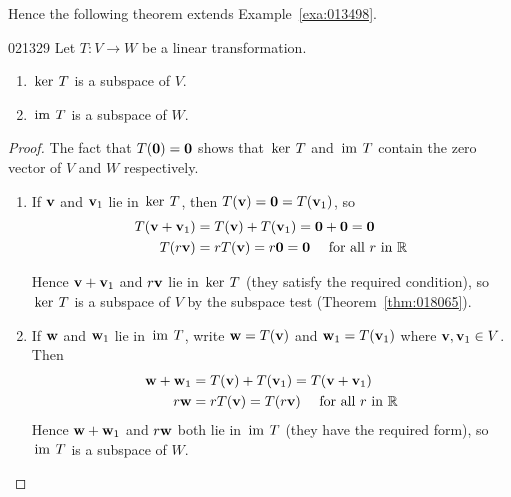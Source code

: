 Hence the following theorem extends Example~\ref{exa:013498}.

\newpage
\begin{theorem}{}{021329}
Let $T : V \to W$ be a linear transformation.


\begin{enumerate}
\item $\thinspace\operatorname{ker \medspace}T$ is a subspace of $V$.

\item $\thinspace\operatorname{im \medspace}T$ is a subspace of $W$.

\end{enumerate}
\end{theorem}

\begin{proof}
The fact that $T(\textbf{0}) = \textbf{0}$ shows that $\thinspace\operatorname{ker \medspace}T$ and $\thinspace\operatorname{im \medspace}T$ contain the zero vector of $V$ and $W$ respectively.


\begin{enumerate}
\item If $\textbf{v}$ and $\textbf{v}_{1}$ lie in $\thinspace\operatorname{ker \medspace}T$, then $T(\textbf{v}) = \textbf{0} = T(\textbf{v}_{1})$, so
\begin{align*}
T(\textbf{v} + \textbf{v}_1) &= T(\textbf{v}) + T(\textbf{v}_1) = \textbf{0} + \textbf{0} = \textbf{0} \\
T(r\textbf{v}) &= rT(\textbf{v}) = r\textbf{0} = \textbf{0} \quad \mbox{ for all } r \mbox{ in } \mathbb{R}
\end{align*}

Hence $\textbf{v} + \textbf{v}_{1}$ and $r\textbf{v}$ lie in $\thinspace\operatorname{ker \medspace}T$ (they satisfy the required condition), so $\thinspace\operatorname{ker \medspace}T$ is a subspace of $V$ by the subspace test (Theorem~\ref{thm:018065}).

\item If $\textbf{w}$ and $\textbf{w}_{1}$ lie in $\thinspace\operatorname{im \medspace}T$, write $\textbf{w} = T(\textbf{v})$ and $\textbf{w}_{1} = T(\textbf{v}_{1})$ where $\textbf{v}, \textbf{v}_{1} \in V$. Then
\begin{align*}
\textbf{w} + \textbf{w}_1 &= T(\textbf{v}) + T(\textbf{v}_1) = T(\textbf{v} + \textbf{v}_1) \\
r\textbf{w} &= rT(\textbf{v}) = T(r\textbf{v}) \quad \mbox{ for all } r \mbox{ in } \mathbb{R}
\end{align*}
Hence $\textbf{w} + \textbf{w}_{1}$ and $r\textbf{w}$ both lie in $\thinspace\operatorname{im \medspace}T$ (they have the required form), so $\thinspace\operatorname{im \medspace}T$ is a subspace of $W$.
\end{enumerate}
\vspace*{-1em}\end{proof}

